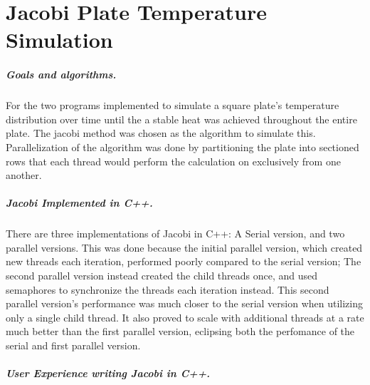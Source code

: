 \chapter{Jacobi Plate Temperature Simulation}
\paragraph{Goals and algorithms.}
For the two programs implemented to simulate a square plate's temperature
distribution over time until the a stable heat was achieved throughout the
entire plate. The jacobi method was chosen as the algorithm to simulate this.
Parallelization of the algorithm was done by partitioning the plate into
sectioned rows that each thread would perform the calculation on exclusively
from one another.

\paragraph{Jacobi Implemented in C++.}
There are three implementations of Jacobi in C++: A Serial version, and two
parallel versions. This was done because the initial parallel version, which
created new threads each iteration, performed poorly compared to the serial
version; The second parallel version instead created the child threads once,
and used semaphores to synchronize the threads each iteration instead. This
second parallel version's performance was much closer to the serial version
when utilizing only a single child thread. It also proved to scale with
additional threads at a rate much better than the first parallel version,
eclipsing both the perfomance of the serial and first parallel version.

\paragraph{User Experience writing Jacobi in C++.}
